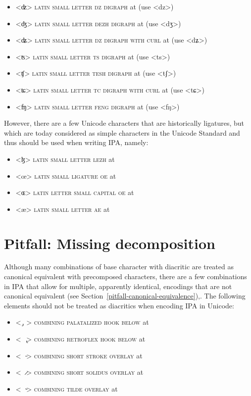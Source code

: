 \begin{itemize} 
	\item[] <ʣ> \textsc{latin small letter dz digraph} at  
	  (use <dz>) 
    \item[] <ʤ> \textsc{latin small letter dezh digraph} at 
      (use <dʒ>)
    \item[] <ʥ> \textsc{latin small letter dz digraph with curl} at 
      (use <dʑ>)
    \item[] <ʦ> \textsc{latin small letter ts digraph} at  
      (use <ts>)
	\item[] <ʧ> \textsc{latin small letter tesh digraph} at  
	  (use <tʃ>) 
    \item[] <ʨ> \textsc{latin small letter tc digraph with curl} at 
      (use <tɕ>)
   	\item[] <ʩ> \textsc{latin small letter feng digraph} at 
	  (use <fŋ>) 
\end{itemize}

However, there are a few Unicode characters that are historically ligatures, but
which are today considered as simple characters in the Unicode Standard and thus
should be used when writing IPA, namely:

\begin{itemize}
	\item[] <ɮ> \textsc{latin small letter lezh} at  
	\item[] <œ> \textsc{latin small ligature oe} at  
	\item[] <ɶ> \textsc{latin letter small capital oe} at  
	\item[] <æ> \textsc{latin small letter ae} at  
\end{itemize}

\section{Pitfall: Missing decomposition}
\label{pitfall-missing-decomposition}

Although many combinations of base character with diacritic are treated as
canonical equivalent with precomposed characters, there are a few combinations
in IPA that allow for multiple, apparently identical, encodings that are not
canonical equivalent (see Section~\ref{pitfall-canonical-equivalence}),. The
following elements should not be treated as diacritics when encoding IPA in
Unicode: 
\begin{itemize}
  \item[] <\ {\large  ̡}\ > \textsc{combining palatalized hook below} at 
  \item[] <\ \ {\large  ̢}> \textsc{combining retroflex hook below} at 
  \item[] <\ \ {\large  ̵}> \textsc{combining short stroke overlay} at 
  \item[] <\ \ {\large  ̷}> \textsc{combining short solidus overlay} at 
  \item[] <\ \ {\large  ̴}> \textsc{combining tilde overlay} at 
\end{itemize} 

